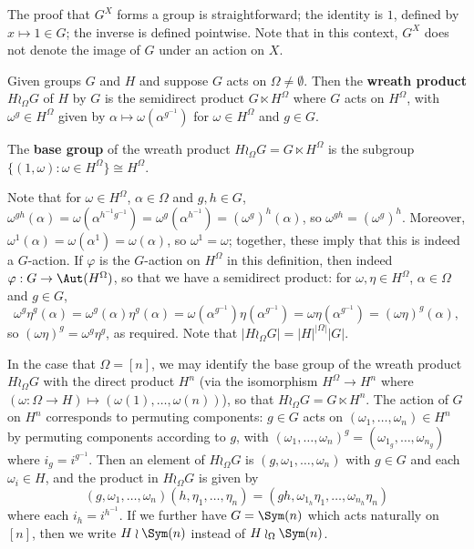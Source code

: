 The proof that $G^X$ forms a group is straightforward; the identity is $1$, defined by $x \mapsto 1 \in G$; the inverse is defined pointwise. Note that in this context, $G^X$ does not denote the image of $G$ under an action on $X$.

\begin{definition}\label{def:wreath_product}
    Given groups $G$ and $H$ and suppose $G$ acts on $\Omega \neq \emptyset$. Then the \textbf{wreath product} $H \wr_\Omega G$ of $H$ by $G$ is the semidirect product $G \ltimes H^\Omega$ where $G$ acts on $H^\Omega$, with $\omega^g \in H^\Omega$ given by $\alpha \mapsto \omega(\alpha^{g^{-1}})$ for $\omega \in H^\Omega$ and $g \in G$.

    The \textbf{base group} of the wreath product $H \wr_\Omega G = G \ltimes H^\Omega$ is the subgroup $\{(1,\omega) : \omega \in H^\Omega\} \cong H^\Omega$.
\end{definition}

Note that for $\omega \in H^\Omega$, $\alpha \in \Omega$ and $g,h \in G$, $\omega^{gh}(\alpha) = \omega(\alpha^{h^{-1}g^{-1}}) = \omega^g(\alpha^{h^{-1}}) = (\omega^g)^h(\alpha)$, so $\omega^{gh} = (\omega^g)^h$. Moreover, $\omega^1(\alpha) = \omega(\alpha^1) = \omega(\alpha)$, so $\omega^1 = \omega$; together, these imply that this is indeed a $G$-action. If $\varphi$ is the $G$-action on $H^\Omega$ in this definition, then indeed $\varphi : G \to \Aut(H^\Omega)$, so that we have a semidirect product: for $\omega,\eta \in H^\Omega$, $\alpha \in \Omega$ and $g \in G$,
$$\omega^g\eta^g(\alpha) = \omega^g(\alpha)\eta^g(\alpha) = \omega(\alpha^{g^{-1}})\eta(\alpha^{g^{-1}}) = \omega\eta(\alpha^{g^{-1}}) = (\omega\eta)^g(\alpha),$$
so $(\omega\eta)^g = \omega^g\eta^g$, as required. Note that $|H \wr_\Omega G| = |H|^{|\Omega|} |G|$.

In the case that $\Omega = [n]$, we may identify the base group of the wreath product $H \wr_\Omega G$ with the direct product $H^n$ (via the isomorphism $H^{\Omega} \to H^n$ where $(\omega : \Omega \to H) \mapsto (\omega(1),\dotsc,\omega(n))$), so that $H \wr_\Omega G = G \ltimes H^n$. The action of $G$ on $H^n$ corresponds to permuting components: $g \in G$ acts on $(\omega_1,\dotsc,\omega_n) \in H^n$ by permuting components according to $g$, with $(\omega_1,\dotsc,\omega_n)^g = (\omega_{1_g},\dotsc,\omega_{n_g})$ where $i_g = i^{g^{-1}}$. Then an element of $H \wr_\Omega G$ is $(g,\omega_1,\dotsc,\omega_n)$ with $g \in G$ and each $\omega_i \in H$, and the product in $H \wr_\Omega G$ is given by
$$(g,\omega_1,\dotsc,\omega_n)(h,\eta_1,\dotsc,\eta_n) = (gh,\omega_{1_h}\eta_1,\dotsc,\omega_{n_h}\eta_n)$$
where each $i_h = i^{h^{-1}}$. If we further have $G = \Sym(n)$ which acts naturally on $[n]$, then we write $H \wr \Sym(n)$ instead of $H \wr_\Omega \Sym(n)$.


